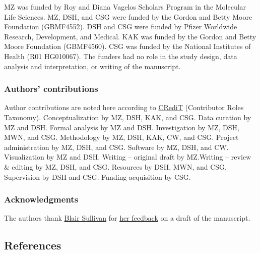 MZ was funded by Roy and Diana Vagelos Scholars Program in the Molecular Life Sciences.
MZ, DSH, and CSG were funded by the Gordon and Betty Moore Foundation (GBMF4552).
DSH and CSG were funded by Pfizer Worldwide Research, Development, and Medical.
KAK was funded by the Gordon and Betty Moore Foundation (GBMF4560).
CSG was funded by the National Institutes of Health (R01 HG010067).
The funders had no role in the study design, data analysis and interpretation, or writing of the manuscript.

\hypertarget{authors-contributions}{%
\subsubsection{Authors' contributions}\label{authors-contributions}}

Author contributions are noted here according to \href{https://credit.niso.org/}{CRediT} (Contributor Roles Taxonomy).
Conceptualization by MZ, DSH, KAK, and CSG.
Data curation by MZ and DSH.
Formal analysis by MZ and DSH.
Investigation by MZ, DSH, MWN, and CSG.
Methodology by MZ, DSH, KAK, CW, and CSG.
Project administration by MZ, DSH, and CSG.
Software by MZ, DSH, and CW.
Visualization by MZ and DSH.
Writing -- original draft by MZ.Writing -- review \& editing by MZ, DSH, and CSG.
Resources by DSH, MWN, and CSG.
Supervision by DSH and CSG.
Funding acquisition by CSG.

\hypertarget{acknowledgments}{%
\subsubsection{Acknowledgments}\label{acknowledgments}}

The authors thank \href{https://orcid.org/0000-0001-7720-6208}{Blair Sullivan} for \href{https://github.com/greenelab/xswap-manuscript/issues/54}{her feedback} on a draft of the manuscript.

\hypertarget{references}{%
\subsection{References}\label{references}}

